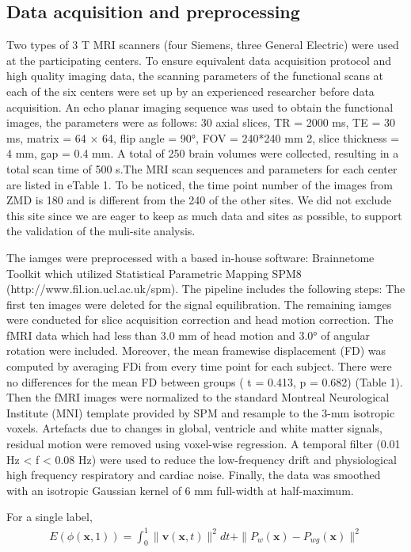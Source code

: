 \documentclass[preprint,authoryear,review,12pt]{elsarticle}
\begin{document}
 
\subsection*{Data acquisition and preprocessing}
 
 
Two types of 3 T MRI scanners (four Siemens, three General Electric) were used at the participating centers. To ensure equivalent data acquisition protocol and high quality imaging data, the scanning parameters of the functional scans at each of the six centers were set up by an experienced researcher before data acquisition. An echo planar imaging sequence was used to obtain the
functional images, the parameters were as follows: 30 axial slices, TR = 2000 ms, TE = 30 ms, matrix = 64 × 64, flip angle = 90°, FOV = 240*240 mm 2, slice thickness = 4 mm, gap = 0.4 mm. A total of 250 brain volumes were collected, resulting in a total scan time of 500 s.The MRI scan sequences and parameters for each center are listed in eTable 1. To be noticed, the time point number of the images from ZMD is 180 and is different from the 240 of the other sites. We did not exclude this site since we are eager to keep as much data and sites as possible, to support the validation of the muli-site analysis.   


The iamges were preprocessed with a based in-house software: Brainnetome Toolkit which utilized Statistical Parametric Mapping SPM8 (http://www.fil.ion.ucl.ac.uk/spm). The pipeline includes the following steps: The first ten images were deleted for the signal equilibration. The remaining iamges were conducted for slice acquisition correction and head motion correction.  The fMRI data which had
less than 3.0 mm of head motion and 3.0° of angular rotation were included.  Moreover, the mean framewise displacement (FD) was computed by averaging FDi from every time point for each subject. There were no differences for the mean FD between groups
( t = 0.413, p = 0.682) (Table 1). Then the fMRI images were normalized to the standard Montreal Neurological Institute (MNI) template provided by SPM and resample to the 3-mm isotropic voxels. Artefacts due to changes in global, ventricle and white matter signals, residual motion were removed using voxel-wise regression. A temporal filter (0.01 Hz < f < 0.08 Hz) were used to reduce the low-frequency drift and physiological high frequency respiratory and cardiac noise.  Finally, the data was smoothed with an isotropic Gaussian kernel of 6 mm full-width at half-maximum. 


For a single label,
\begin{align}
  E(\phi(\mathbf{x},1)) = \int_0^1 \|\mathbf{v}(\mathbf{x},t)\|^2 dt +
      \|P_w(\mathbf{x}) -P_{wg}(\mathbf{x})\|^2
\end{align}
\end{document}
